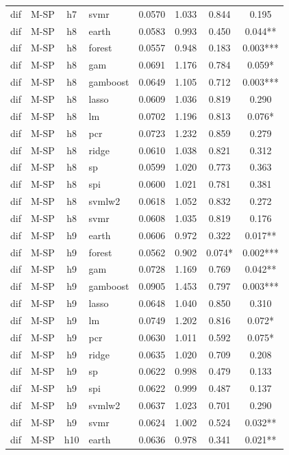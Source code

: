 \begin{ThreePartTable}
\begin{longtable}[t]{llclcccc}
dif & M-SP & h7 & svmr & 0.0570 & 1.033 & 0.844 & 0.195\\
\addlinespace
dif & M-SP & h8 & earth & 0.0583 & 0.993 & 0.450 & 0.044**\\
dif & M-SP & h8 & forest & 0.0557 & 0.948 & 0.183 & 0.003***\\
dif & M-SP & h8 & gam & 0.0691 & 1.176 & 0.784 & 0.059*\\
dif & M-SP & h8 & gamboost & 0.0649 & 1.105 & 0.712 & 0.003***\\
dif & M-SP & h8 & lasso & 0.0609 & 1.036 & 0.819 & 0.290\\
dif & M-SP & h8 & lm & 0.0702 & 1.196 & 0.813 & 0.076*\\
dif & M-SP & h8 & pcr & 0.0723 & 1.232 & 0.859 & 0.279\\
dif & M-SP & h8 & ridge & 0.0610 & 1.038 & 0.821 & 0.312\\
dif & M-SP & h8 & sp & 0.0599 & 1.020 & 0.773 & 0.363\\
dif & M-SP & h8 & spi & 0.0600 & 1.021 & 0.781 & 0.381\\
dif & M-SP & h8 & svmlw2 & 0.0618 & 1.052 & 0.832 & 0.272\\
dif & M-SP & h8 & svmr & 0.0608 & 1.035 & 0.819 & 0.176\\
\addlinespace
dif & M-SP & h9 & earth & 0.0606 & 0.972 & 0.322 & 0.017**\\
dif & M-SP & h9 & forest & 0.0562 & 0.902 & 0.074* & 0.002***\\
dif & M-SP & h9 & gam & 0.0728 & 1.169 & 0.769 & 0.042**\\
dif & M-SP & h9 & gamboost & 0.0905 & 1.453 & 0.797 & 0.003***\\
dif & M-SP & h9 & lasso & 0.0648 & 1.040 & 0.850 & 0.310\\
dif & M-SP & h9 & lm & 0.0749 & 1.202 & 0.816 & 0.072*\\
dif & M-SP & h9 & pcr & 0.0630 & 1.011 & 0.592 & 0.075*\\
dif & M-SP & h9 & ridge & 0.0635 & 1.020 & 0.709 & 0.208\\
dif & M-SP & h9 & sp & 0.0622 & 0.998 & 0.479 & 0.133\\
dif & M-SP & h9 & spi & 0.0622 & 0.999 & 0.487 & 0.137\\
dif & M-SP & h9 & svmlw2 & 0.0637 & 1.023 & 0.701 & 0.290\\
dif & M-SP & h9 & svmr & 0.0624 & 1.002 & 0.524 & 0.032**\\
\addlinespace
dif & M-SP & h10 & earth & 0.0636 & 0.978 & 0.341 & 0.021**\\

\end{longtable}
\end{ThreePartTable}
